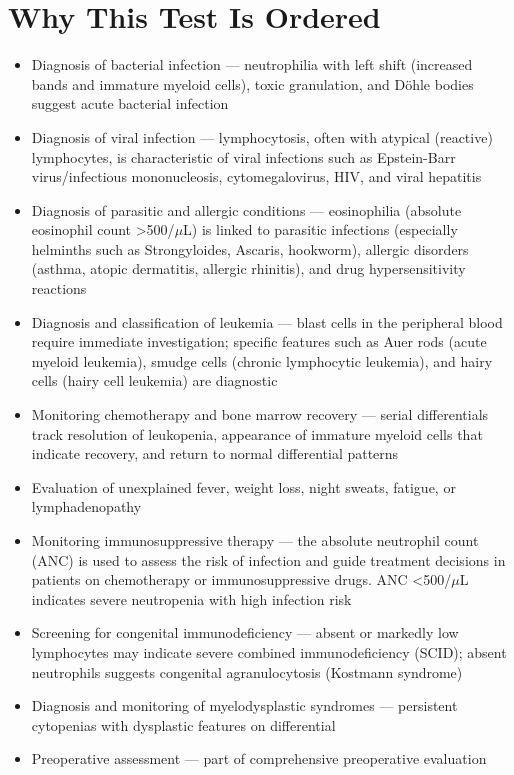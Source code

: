 \section*{Why This Test Is Ordered}
\begin{itemize}
  \item Diagnosis of bacterial infection --- neutrophilia with left shift (increased bands and immature myeloid cells), toxic granulation, and D\"{o}hle bodies suggest acute bacterial infection
  \item Diagnosis of viral infection --- lymphocytosis, often with atypical (reactive) lymphocytes, is characteristic of viral infections such as Epstein-Barr virus/infectious mononucleosis, cytomegalovirus, HIV, and viral hepatitis
  \item Diagnosis of parasitic and allergic conditions --- eosinophilia (absolute eosinophil count >500/$\mu$L) is linked to parasitic infections (especially helminths such as Strongyloides, Ascaris, hookworm), allergic disorders (asthma, atopic dermatitis, allergic rhinitis), and drug hypersensitivity reactions
  \item Diagnosis and classification of leukemia --- blast cells in the peripheral blood require immediate investigation; specific features such as Auer rods (acute myeloid leukemia), smudge cells (chronic lymphocytic leukemia), and hairy cells (hairy cell leukemia) are diagnostic
  \item Monitoring chemotherapy and bone marrow recovery --- serial differentials track resolution of leukopenia, appearance of immature myeloid cells that indicate recovery, and return to normal differential patterns
  \item Evaluation of unexplained fever, weight loss, night sweats, fatigue, or lymphadenopathy
  \item Monitoring immunosuppressive therapy --- the absolute neutrophil count (ANC) is used to assess the risk of infection and guide treatment decisions in patients on chemotherapy or immunosuppressive drugs. ANC <500/$\mu$L indicates severe neutropenia with high infection risk
  \item Screening for congenital immunodeficiency --- absent or markedly low lymphocytes may indicate severe combined immunodeficiency (SCID); absent neutrophils suggests congenital agranulocytosis (Kostmann syndrome)
  \item Diagnosis and monitoring of myelodysplastic syndromes --- persistent cytopenias with dysplastic features on differential
  \item Preoperative assessment --- part of comprehensive preoperative evaluation
\end{itemize}

